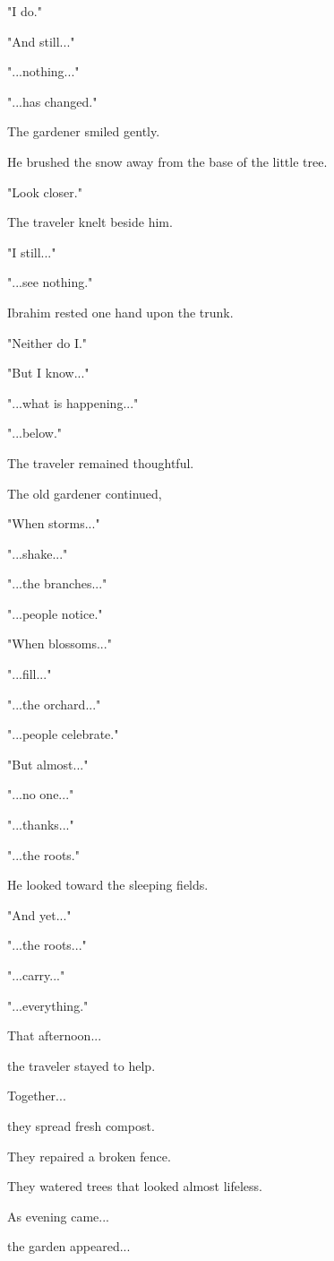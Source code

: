 \documentclass[12pt,openany]{book}
\begin{document}
"I do."

"And still..."

"...nothing..."

"...has changed."

The gardener smiled gently.

He brushed the snow away from the base of the little tree.

"Look closer."

The traveler knelt beside him.

"I still..."

"...see nothing."

Ibrahim rested one hand upon the trunk.

"Neither do I."

"But I know..."

"...what is happening..."

"...below."

The traveler remained thoughtful.

The old gardener continued,

"When storms..."

"...shake..."

"...the branches..."

"...people notice."

"When blossoms..."

"...fill..."

"...the orchard..."

"...people celebrate."

"But almost..."

"...no one..."

"...thanks..."

"...the roots."

He looked toward the sleeping fields.

"And yet..."

"...the roots..."

"...carry..."

"...everything."

That afternoon...

the traveler stayed to help.

Together...

they spread fresh compost.

They repaired a broken fence.

They watered trees that looked almost lifeless.

As evening came...

the garden appeared...
\end{document}
